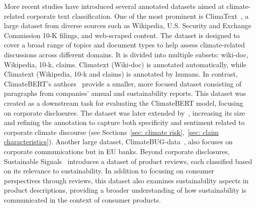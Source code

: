 \datasets More recent studies have introduced several annotated datasets aimed at climate-related corporate text classification. One of the most prominent is ClimaText~\citep{varini_climatext_2020}, a large dataset from diverse sources such as Wikipedia, U.S. Security and Exchange Commission 10-K filings, and web-scraped content. The dataset is designed to cover a broad range of topics and document types to help assess climate-related discussions across different domains. It is divided into multiple subsets: wiki-doc, Wikipedia, 10-k, claims. Climatext (Wiki-doc) is annotated automatically, while Climatext (Wikipedia, 10-k and claims) is annotated by humans.
In contrast, ClimateBERT's authors~\citep{nicolas_webersinke_climatebert_2021} provide a smaller, more focused dataset consisting of paragraphs from companies' annual and sustainability reports. This dataset was created as a downstream task for evaluating the ClimateBERT model, focusing on corporate disclosures. The dataset was later extended by~\citet{bingler2023cheaptalkspecificitysentiment}, increasing its size and refining the annotation to capture both specificity and sentiment related to corporate climate discourse (see Sections~\ref{sec: climate risk},~\ref{sec: claim characteristics}).
Another large dataset, ClimateBUG-data~\citep{yu_climatebug_2024}, also focuses on corporate communications but in EU banks.
Beyond corporate disclosures, Sustainable Signals~\citep{linSUSTAINABLESIGNALSijcai2023} introduces a dataset of product reviews, each classified based on its relevance to sustainability. In addition to focusing on consumer perspectives through reviews, this dataset also examines sustainability aspects in product descriptions, providing a broader understanding of how sustainability is communicated in the context of consumer products.

